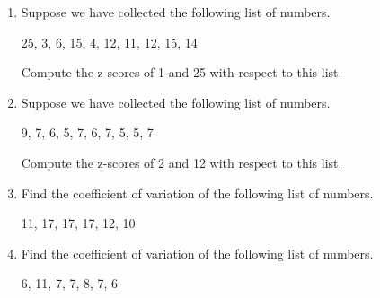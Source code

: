 \documentclass{article}
\begin{document}
\begin{enumerate}
  
\vspace{5cm}

\item Suppose we have collected the following list of numbers.

\begin{center}
25, 3, 6, 15, 4, 12, 11, 12, 15, 14
\end{center}

Compute the z-scores of 1 and 25 with respect to this list.



  
\vspace{5cm}

\item Suppose we have collected the following list of numbers.

\begin{center}
9, 7, 6, 5, 7, 6, 7, 5, 5, 7
\end{center}

Compute the z-scores of 2 and 12 with respect to this list.



  
\vspace{5cm}

\item Find the coefficient of variation of the following list of numbers.

\begin{center}
11, 17, 17, 17, 12, 10
\end{center}



  
\vspace{5cm}

\item Find the coefficient of variation of the following list of numbers.

\begin{center}
6, 11, 7, 7, 8, 7, 6
\end{center}



  
\vspace{5cm}
\end{enumerate}
\end{document}
